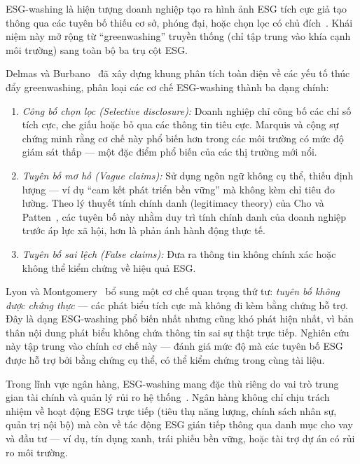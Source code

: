 ESG-washing là hiện tượng doanh nghiệp tạo ra hình ảnh ESG tích cực giả tạo thông qua các tuyên bố thiếu cơ sở, phóng đại, hoặc chọn lọc có chủ đích~\cite{delmas2011drivers, lyon2015means}. Khái niệm này mở rộng từ ``greenwashing'' truyền thống (chỉ tập trung vào khía cạnh môi trường) sang toàn bộ ba trụ cột ESG.

Delmas và Burbano~\cite{delmas2011drivers} đã xây dựng khung phân tích toàn diện về các yếu tố thúc đẩy greenwashing, phân loại các cơ chế ESG-washing thành ba dạng chính:

\begin{enumerate}
    \item \textit{Công bố chọn lọc (Selective disclosure):} Doanh nghiệp chỉ công bố các chỉ số tích cực, che giấu hoặc bỏ qua các thông tin tiêu cực. Marquis và cộng sự~\cite{marquis2016scrutiny} chứng minh rằng cơ chế này phổ biến hơn trong các môi trường có mức độ giám sát thấp — một đặc điểm phổ biến của các thị trường mới nổi.
    \item \textit{Tuyên bố mơ hồ (Vague claims):} Sử dụng ngôn ngữ không cụ thể, thiếu định lượng --- ví dụ ``cam kết phát triển bền vững'' mà không kèm chỉ tiêu đo lường. Theo lý thuyết tính chính danh (legitimacy theory) của Cho và Patten~\cite{cho2007role}, các tuyên bố này nhằm duy trì tính chính danh của doanh nghiệp trước áp lực xã hội, hơn là phản ánh hành động thực tế.
    \item \textit{Tuyên bố sai lệch (False claims):} Đưa ra thông tin không chính xác hoặc không thể kiểm chứng về hiệu quả ESG.
\end{enumerate}

Lyon và Montgomery~\cite{lyon2015means} bổ sung một cơ chế quan trọng thứ tư: \textit{tuyên bố không được chứng thực} --- các phát biểu tích cực mà không đi kèm bằng chứng hỗ trợ. Đây là dạng ESG-washing phổ biến nhất nhưng cũng khó phát hiện nhất, vì bản thân nội dung phát biểu không chứa thông tin sai sự thật trực tiếp. Nghiên cứu này tập trung vào chính cơ chế này --- đánh giá mức độ mà các tuyên bố ESG được hỗ trợ bởi bằng chứng cụ thể, có thể kiểm chứng trong cùng tài liệu.

Trong lĩnh vực ngân hàng, ESG-washing mang đặc thù riêng do vai trò trung gian tài chính và quản lý rủi ro hệ thống~\cite{lagasio2024esg}. Ngân hàng không chỉ chịu trách nhiệm về hoạt động ESG trực tiếp (tiêu thụ năng lượng, chính sách nhân sự, quản trị nội bộ) mà còn về tác động ESG gián tiếp thông qua danh mục cho vay và đầu tư --- ví dụ, tín dụng xanh, trái phiếu bền vững, hoặc tài trợ dự án có rủi ro môi trường.

